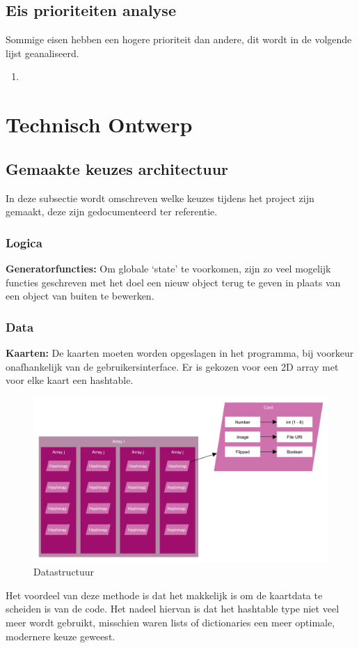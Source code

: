 \documentclass[a4paper,titlepage,11pt]{article}
\begin{document}
\subsection{Eis prioriteiten analyse}

Sommige eisen hebben een hogere prioriteit dan andere, dit wordt in de volgende lijst
geanaliseerd.

\begin{enumerate}
\item 
\end{enumerate}

\clearpage

\section{Technisch Ontwerp}

\subsection{Gemaakte keuzes architectuur}

In deze subsectie wordt omschreven welke keuzes tijdens het project zijn gemaakt,
deze zijn gedocumenteerd ter referentie.

\subsubsection{Logica}

{\bf Generatorfuncties:}
Om globale `state' te voorkomen, zijn zo veel mogelijk functies geschreven met
het doel een nieuw object terug te geven in plaats van een object van buiten te bewerken.

\subsubsection{Data}

{\bf Kaarten:}
De kaarten moeten worden opgeslagen in het programma,
bij voorkeur onafhankelijk van de gebruikersinterface.
Er is gekozen voor een 2D array met voor elke kaart een hashtable.

\begin{figure}[!hb]
  \includegraphics[width=\linewidth]{../Images/datastructure.pdf}
  \caption{Datastructuur}\label{fig:datastructure}
\end{figure}

Het voordeel van deze methode is dat het makkelijk is om de kaartdata te scheiden is
van de code.
Het nadeel hiervan is dat het hashtable type niet veel meer wordt gebruikt, misschien
waren lists of dictionaries een meer optimale, modernere keuze geweest.
\end{document}
